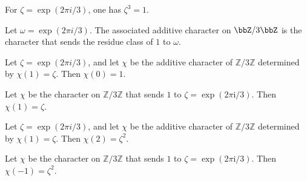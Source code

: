 \begin{theorem}
\label{FABL.modThreeCubicRoot_cube}
\leanok
{}
For $\zeta=\exp(2\pi i/3)$, one has $\zeta^3=1$.
\end{theorem}

\begin{definition}
\label{FABL.modThreeCubicCharacter}
\leanok
{}
Let $\omega=\exp(2\pi i/3)$. The associated additive character on $\bbZ/3\bbZ$ is the
character that sends the residue class of $1$ to $\omega$.
\end{definition}

\begin{theorem}
\label{FABL.modThreeCubicCharacter_zero}
\leanok
{}
Let $\zeta=\exp(2\pi i/3)$, and let $\chi$ be the additive character of $\mathbb
Z/3\mathbb Z$ determined by $\chi(1)=\zeta$. Then $\chi(0)=1$.
\end{theorem}

\begin{theorem}
\label{FABL.modThreeCubicCharacter_one}
\leanok
{}
Let $\chi$ be the character on $\mathbb Z/3\mathbb Z$ that sends $1$ to
$\zeta=\exp(2\pi\mathrm{i}/3)$. Then $\chi(1)=\zeta$.
\end{theorem}

\begin{theorem}
\label{FABL.modThreeCubicCharacter_two}
\leanok
{}
Let $\zeta=\exp(2\pi i/3)$, and let $\chi$ be the additive character of $\mathbb
Z/3\mathbb Z$ determined by $\chi(1)=\zeta$. Then $\chi(2)=\zeta^2$.
\end{theorem}

\begin{theorem}
\label{FABL.modThreeCubicCharacter_neg_one}
\leanok
{}
Let $\chi$ be the character on $\mathbb Z/3\mathbb Z$ that sends $1$ to
$\zeta=\exp(2\pi\mathrm{i}/3)$. Then $\chi(-1)=\zeta^2$.
\end{theorem}


